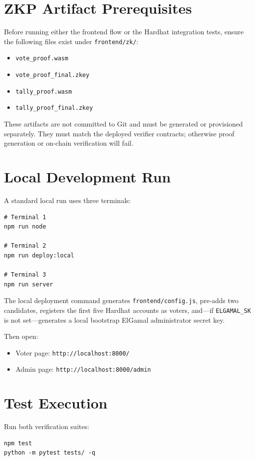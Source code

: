 \section{ZKP Artifact Prerequisites}
Before running either the frontend flow or the Hardhat integration tests, ensure the following files exist under \texttt{frontend/zk/}:
\begin{itemize}
    \item \texttt{vote\_proof.wasm}
    \item \texttt{vote\_proof\_final.zkey}
    \item \texttt{tally\_proof.wasm}
    \item \texttt{tally\_proof\_final.zkey}
\end{itemize}
These artifacts are not committed to Git and must be generated or provisioned separately. They must match the deployed verifier contracts; otherwise proof generation or on-chain verification will fail.

\section{Local Development Run}
A standard local run uses three terminals:
\begin{verbatim}
# Terminal 1
npm run node

# Terminal 2
npm run deploy:local

# Terminal 3
npm run server
\end{verbatim}

The local deployment command generates \texttt{frontend/config.js}, pre-adds two candidates, registers the first five Hardhat accounts as voters, and---if \texttt{ELGAMAL\_SK} is not set---generates a local bootstrap ElGamal administrator secret key.

Then open:
\begin{itemize}
    \item Voter page: \texttt{http://localhost:8000/}
    \item Admin page: \texttt{http://localhost:8000/admin}
\end{itemize}

\section{Test Execution}
Run both verification suites:
\begin{verbatim}
npm test
python -m pytest tests/ -q
\end{verbatim}

